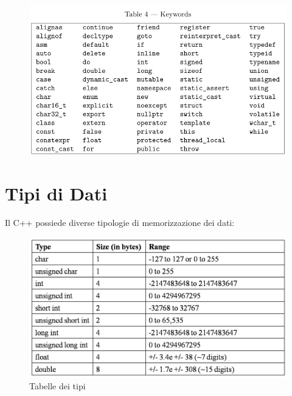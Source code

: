 \begin{figure}[H]
	\centering
	\includegraphics[width=1\textwidth, height=1\textheight, keepaspectratio]{./imgs/keywords2.png}
	\label{fig:keywords}
\end{figure}


\newpage

\section{Tipi di Dati}


\textsf{\small Il C++ possiede diverse tipologie di memorizzazione dei dati: }\\

\begin{figure}[ht]
	\centering
	\includegraphics[width=1\textwidth, height=1\textheight, keepaspectratio]{./imgs/data_types_table.png}
	\caption{Tabelle dei tipi}
	\label{fig:data_types}
\end{figure}

